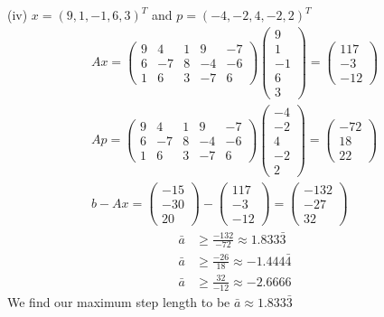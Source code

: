 \documentclass{article}
\begin{document}
\setcounter{equation}{0}
\noindent(iv) $x = (9,1,-1,6,3)^T$ and $p = (-4,-2,4,-2,2)^T$
\begin{align*}
    Ax = \begin{pmatrix}
        9 & 4 & 1 & 9 & -7 \\
        6 & -7 & 8 & -4 & -6 \\ 
        1 & 6 & 3 & -7 & 6
    \end{pmatrix}
    \begin{pmatrix}
        9 \\ 1 \\ -1 \\ 6 \\ 3
    \end{pmatrix} = \begin{pmatrix}
        117 \\ -3 \\ -12
    \end{pmatrix} \\
    Ap = \begin{pmatrix}
        9 & 4 & 1 & 9 & -7 \\
        6 & -7 & 8 & -4 & -6 \\ 
        1 & 6 & 3 & -7 & 6
    \end{pmatrix}
    \begin{pmatrix}
        -4 \\ -2 \\ 4 \\ -2 \\ 2
    \end{pmatrix} = \begin{pmatrix}
        -72 \\ 18 \\ 22
    \end{pmatrix} \\
    b - Ax = \begin{pmatrix}
        -15 \\ -30 \\ 20  
    \end{pmatrix} -
    \begin{pmatrix}
        117 \\ -3 \\ -12
    \end{pmatrix} =
    \begin{pmatrix}
        -132 \\ -27 \\ 32
    \end{pmatrix} 
\end{align*}
\begin{align}
    \bar{a} &\geq \frac{-132}{-72} \approx 1.833\bar{3} \\
    \bar{a} & \geq \frac{-26}{18} \approx -1.444\bar{4} \\
    \bar{a} & \geq \frac{32}{-12} \approx -2.6666
\end{align}
We find our maximum step length to be $\bar{a} \approx 1.833\bar{3}$
\end{document}
